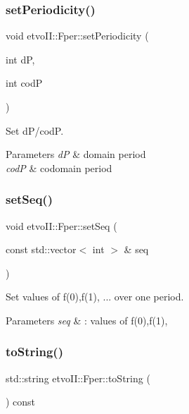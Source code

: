 \subsubsection{\texorpdfstring{set\+Periodicity()}{setPeriodicity()}}
{\footnotesize\ttfamily void etvo\+I\+I\+::\+Fper\+::set\+Periodicity (\begin{DoxyParamCaption}\item[{int}]{dP,  }\item[{int}]{codP }\end{DoxyParamCaption})}



Set d\+P/codP. 


\begin{DoxyParams}{Parameters}
{\em dP} & domain period \\
\hline
{\em codP} & codomain period \\
\hline
\end{DoxyParams}
\mbox{\label{classetvo_i_i_1_1_fper_a36fd97d564817c9dbcf345ce18f92219}} 
\subsubsection{\texorpdfstring{set\+Seq()}{setSeq()}}
{\footnotesize\ttfamily void etvo\+I\+I\+::\+Fper\+::set\+Seq (\begin{DoxyParamCaption}\item[{const std\+::vector$<$ int $>$ \&}]{seq }\end{DoxyParamCaption})}



Set values of f(0),f(1), ... over one period. 


\begin{DoxyParams}{Parameters}
{\em seq} & \+: values of f(0),f(1), \\
\hline
\end{DoxyParams}
\mbox{\label{classetvo_i_i_1_1_fper_a53276a36ff7ada879be26655ccff7ed6}} 
\subsubsection{\texorpdfstring{to\+String()}{toString()}}
{\footnotesize\ttfamily std\+::string etvo\+I\+I\+::\+Fper\+::to\+String (\begin{DoxyParamCaption}{ }\end{DoxyParamCaption}) const\hspace{0.3cm}{\ttfamily [virtual]}}


